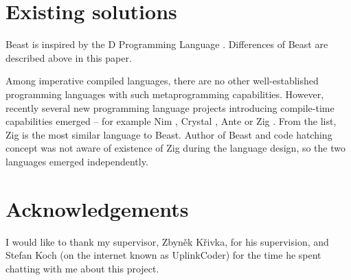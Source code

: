 \documentclass{ExcelAtFIT}
\begin{document}
\begin{comment}
There is still a big difference between \ctime and \nonctime variables. First, this "runtime mirroring" is not necessary at all in a lot of practical use cases. Second, the mirroring can be a lot faster than runtime execution -- mirroring does not require the evaluation to be done at runtime, a simple memory overwrite with newer values (and only where the \ctime data changed since the last mirroring) is enough.

The compiler has a virtual memory address space that is used during interpretation. This address space is different from the address space of an output binary file. Since it is possible to have references (and pointers) during compile time, it is necessary to implement address translation between these two address spaces. Because of that, the compiler has to know what data in the virtual memory is a reference, because values of \ctime references are changed during the linking process. This is realized by dedicated interpreter instructions called within reference (pointer) constructor/destructors that mark/unmark the memory as a reference.

This text briefly describes all key components necessary to implement the code hatching concept. More in-depth analysis can be found in bachelor thesis downloadable from the Git repository.
\end{comment} 

\section{Existing solutions}
Beast is inspired by the D Programming Language \cite{DLang}. Differences of Beast are described above in this paper.

Among imperative compiled languages, there are no other well-established programming languages with such metaprogramming capabilities. However, recently several new programming language projects introducing compile-time capabilities emerged -- for example Nim \cite{NimLang}, Crystal \cite{CrystalLang}, Ante \cite{AnteLang} or Zig \cite{ZigLang}. From the list, Zig is the most similar language to Beast. Author of Beast and code hatching concept was not aware of existence of Zig during the language design, so the two languages emerged independently.

\section*{Acknowledgements}
I would like to thank my supervisor, Zbyněk Křivka, for his supervision, and Stefan Koch (on the internet known as UplinkCoder) for the time he spent chatting with me about this project.
\end{document}
